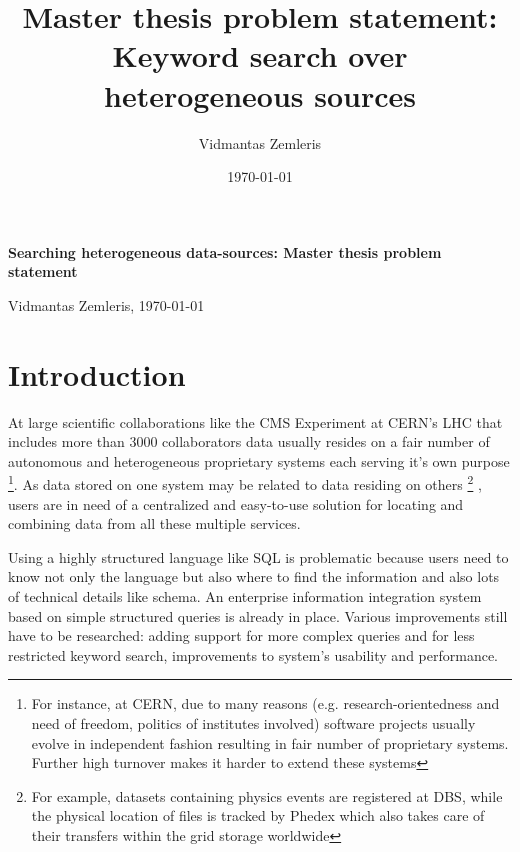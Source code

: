 \documentclass[a4paper,11pt]{article}
\begin{document}
\addtolength{\textheight}{10mm}

 
\title{Master thesis problem statement: Keyword search over heterogeneous sources} %
\author{Vidmantas Zemleris}  %
\date{\today}  %
 

%
 \centerline{\Large \bf Searching heterogeneous data-sources: Master thesis problem statement} %
 \medskip
 
 \centerline{Vidmantas Zemleris, \today}  %
 \medskip
 


 
\section{Introduction}
At large scientific collaborations like the CMS Experiment at CERN's LHC that includes more than 3000 collaborators data usually resides on a fair number of autonomous and heterogeneous proprietary systems each serving it's own purpose
\footnote{For instance, at CERN,  due to many reasons (e.g. research-orientedness and need of freedom, politics of institutes involved) software projects usually evolve in independent fashion resulting in fair number of proprietary systems\cite{Koch00CERN}. Further high turnover makes it harder to extend these systems}. As data stored on one system may be related to data residing on others%
	\footnote{For example, datasets containing physics events are registered at DBS, while the physical location of files is tracked by Phedex which also takes care of their transfers within the grid storage worldwide}%
, users are in need of a centralized and easy-to-use solution for locating and combining data from all these multiple services.

Using a highly structured language like SQL is problematic because users need to know not only the language but also where to find the information and also lots of technical details like schema. An enterprise information integration system based on simple structured queries is already in place. Various improvements  still have to be researched: adding support for more complex queries and for less restricted keyword search, improvements to system's usability and performance.
\end{document}
